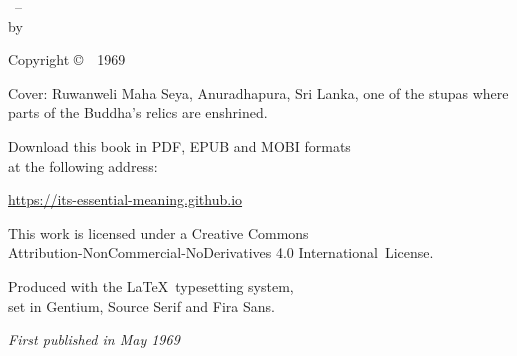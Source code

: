 \cleartoverso
\thispagestyle{empty}

{\copyrightsize
\centering
\setlength{\parindent}{0pt}%
\setlength{\parskip}{0.8\baselineskip}%

\thetitle\ -- \thesubtitle\\
by \theauthor

Copyright \copyright\ \theauthor\ 1969

Cover: Ruwanweli Maha Seya, Anuradhapura, Sri Lanka, one of the stupas where parts of the Buddha's relics are enshrined.

Download this book in PDF, EPUB and MOBI formats\\ at the following address:

\href{https://its-essential-meaning.github.io}{https://its-essential-meaning.github.io}

\vfill

{\footnotesize

This work is licensed under a Creative Commons\\
Attribution-NonCommercial-NoDerivatives 4.0 International~License.

Produced with the \LaTeX\ typesetting system,\\
set in Gentium, Source Serif and Fira Sans.

\emph{First published in May 1969}

\theEditionInfo

}}
